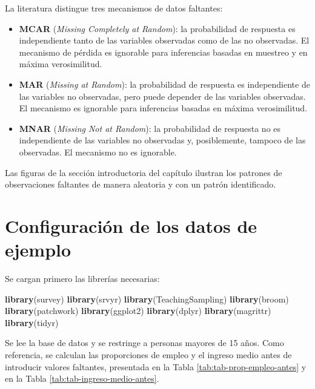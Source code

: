 \documentclass[
  spanish,
  12pt,
]{book}
\newenvironment{Shaded}{\begin{snugshade}}{\end{snugshade}}
\newcommand{\FunctionTok}[1]{\textcolor[rgb]{0.13,0.29,0.53}{\textbf{#1}}}
\newcommand{\NormalTok}[1]{#1}
\begin{document}
La literatura distingue tres mecanismos de datos faltantes:

\begin{itemize}
\item
  \textbf{MCAR} (\emph{Missing Completely at Random}): la probabilidad de respuesta es independiente tanto de las variables observadas como de las no observadas. El mecanismo de pérdida es ignorable para inferencias basadas en muestreo y en máxima verosimilitud.
\item
  \textbf{MAR} (\emph{Missing at Random}): la probabilidad de respuesta es independiente de las variables no observadas, pero puede depender de las variables observadas. El mecanismo es ignorable para inferencias basadas en máxima verosimilitud.
\item
  \textbf{MNAR} (\emph{Missing Not at Random}): la probabilidad de respuesta no es independiente de las variables no observadas y, posiblemente, tampoco de las observadas. El mecanismo no es ignorable.
\end{itemize}

Las figuras de la sección introductoria del capítulo ilustran los patrones de observaciones faltantes de manera aleatoria y con un patrón identificado.

\section{Configuración de los datos de ejemplo}\label{sec-configuracion}

Se cargan primero las librerías necesarias:

\begin{Shaded}
\begin{Highlighting}[]
\FunctionTok{library}\NormalTok{(survey)}
\FunctionTok{library}\NormalTok{(srvyr)}
\FunctionTok{library}\NormalTok{(TeachingSampling)}
\FunctionTok{library}\NormalTok{(broom)}
\FunctionTok{library}\NormalTok{(patchwork)}
\FunctionTok{library}\NormalTok{(ggplot2)}
\FunctionTok{library}\NormalTok{(dplyr)}
\FunctionTok{library}\NormalTok{(magrittr)}
\FunctionTok{library}\NormalTok{(tidyr)}
\end{Highlighting}
\end{Shaded}

Se lee la base de datos y se restringe a personas mayores de 15 años. Como referencia, se calculan las proporciones de empleo y el ingreso medio antes de introducir valores faltantes, presentada en la Tabla \ref{tab:tab-prop-empleo-antes} y en la Tabla \ref{tab:tab-ingreso-medio-antes}.
\end{document}
